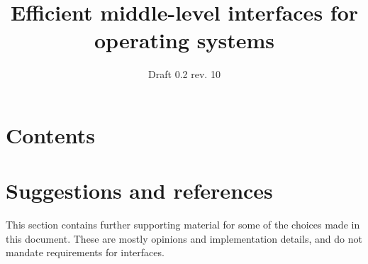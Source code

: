 \documentclass[a4paper,utf8,11pt]{article}
\title{Efficient middle-level interfaces for operating systems}
\author{}
\date{Draft 0.2 rev. 10}
\begin{document}
	\maketitle
	
	
	\section{Contents}
	\tableofcontents
	
	
	
	
	
	
	
	
	
	\section{Suggestions and references}
	This section contains further supporting material for some of the choices made in this document. These are mostly opinions and implementation details, and do not mandate requirements for interfaces.
\end{document}

